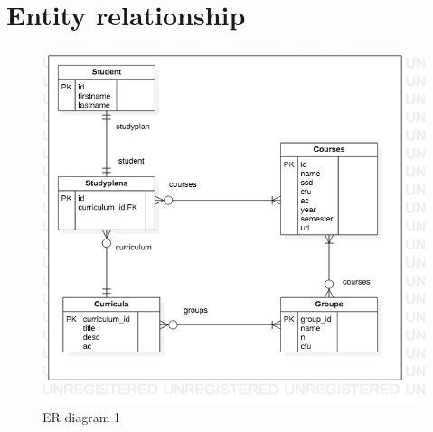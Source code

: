 \documentclass{article}
\begin{document}
\section{Entity relationship}
\begin{figure}[!h]
  \begin{center}
   \includegraphics[width=\textwidth]{img/ERDdiagramConcettuale.png}
     \caption{ER diagram 1}
  \label{fig:EntityRelationshipdiagram1}
  \end{center}
\end{figure}
\end{document}
